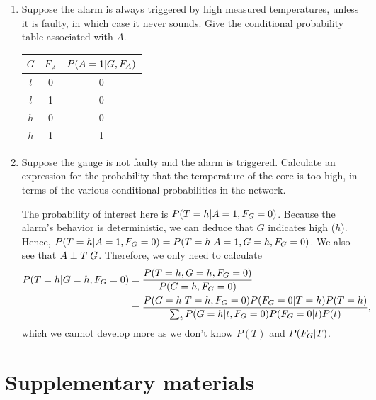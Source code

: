 \documentclass[11pt, a4paper]{article}
\begin{document}
\begin{enumerate}
    \item Suppose the alarm is always triggered by high measured temperatures, unless it is faulty, in which case it never sounds. Give the conditional probability table associated with $A$.
    
    \begin{solution}
        \begin{center}
            \begin{tabular}{cc|c}
                \toprule
                 $G$ & $F_A$ & $P(A = 1 \vert G, F_A)$ \\
                 \midrule
                 $l$ & 0 & 0 \\
                 $l$ & 1 & 0 \\
                 $h$ & 0 & 0 \\
                 $h$ & 1 & 1 \\
                 \bottomrule
            \end{tabular}
        \end{center}
    \end{solution}
    
    \item Suppose the gauge is not faulty and the alarm is triggered. Calculate an expression for the probability that the temperature of the core is too high, in terms of the various conditional probabilities in the network.
    
    \begin{solution}
        The probability of interest here is $P(T = h \vert A = 1, F_G = 0)$. Because the alarm's behavior is deterministic, we can deduce that $G$ indicates high ($h$). Hence, $P(T = h \vert A = 1, F_G = 0) = P(T = h \vert A = 1, G = h, F_G = 0)$. We also see that $A \perp T \vert G$. Therefore, we only need to calculate
        \begin{align*}
            P(T = h \vert G = h, F_G = 0) & = \frac{P(T = h, G = h, F_G = 0)}{P(G = h, F_G = 0)} \\
            & = \frac{P(G = h \vert T = h, F_G = 0) P(F_G = 0 \vert T = h) P(T = h)}{\sum_t P(G = h \vert t, F_G = 0) P(F_G = 0 \vert t) P(t)} ,
        \end{align*}
        which we cannot develop more as we don't know $P(T)$ and $P(F_G \vert T)$.
    \end{solution}
\end{enumerate}

\newpage

\section*{Supplementary materials}
\end{document}
